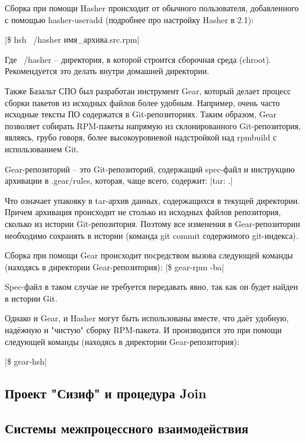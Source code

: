 \documentclass[bachelor, och, pract]{SCWorks}
\begin{document}
Сборка при помощи Hasher происходит от обычного пользователя, добавленного с помощью hasher-useradd (подробнее про настройку Hasher в 2.1):

|\$ hsh ~/hasher имя_архива.src.rpm| %

Где ~/hasher -- директория, в которой строится сборочная среда (chroot). Рекомендуется это делать внутри домашней директории.

Также Базальт СПО был разработан инструмент Gear, который делает процесс сборки пакетов из исходных файлов более удобным. 
Например, очень часто исходные тексты ПО содержатся в Git-репозиториях.
Таким образом, Gear позволяет собирать RPM-пакеты напрямую из склонированного Git-репозитория, являясь, грубо говоря, более высокоуровневой надстройкой над rpmbuild с использованием Git.

Gear-репозиторий -- это Git-репозиторий, содержащий spec-файл и инструкцию архивации в .gear/rules, которая, чаще всего, содержит:
|tar: .|

Что означает упаковку в tar-архив данных, содержащихся в текущей директории.
Причем архивация происходит не столько из исходных файлов репозитория, сколько из истории Git-репозитория. 
Поэтому все изменения в Gear-репозитории необходимо сохранять в истории (команда git commit содержимого git-индекса).

Сборка при помощи Gear происходит посредством вызова следующей команды (находясь в директории Gear-репозитория):
|\$ gear-rpm -ba|

Spec-файл в таком случае не требуется передавать явно, так как он будет найден в истории Git.

Однако и Gear, и Hasher могут быть использованы вместе, что даёт удобную, надёжную и "чистую" сборку RPM-пакета.
И производится это при помощи следующей команды (находясь в директории Gear-репозитория):

|\$ gear-hsh|

\subsection{Проект "Сизиф" и процедура Join}


\subsection{Системы межпроцессного взаимодействия}

\newpage
\end{document}
